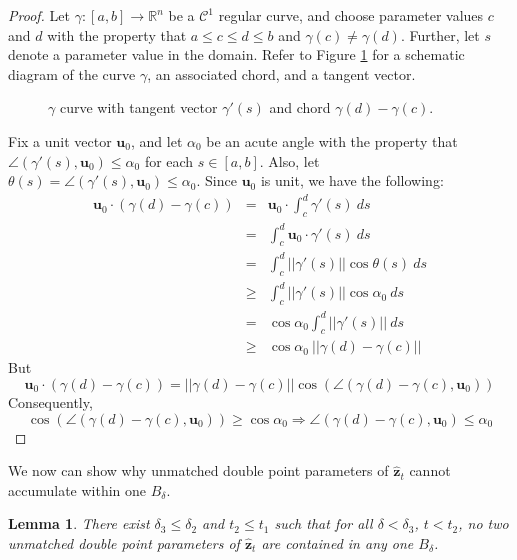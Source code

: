 \documentclass[12pt]{article}
\numberwithin{equation}{subsection}
\newtheorem{lem}{Lemma}[thm]
\theoremstyle{definition}
\numberwithin{lem}{section}
\def\zhat{\mathbf{\hat{z}}}
\def\C{\mathcal{C}}
\begin{document}
\begin{proof}
Let $\gamma: [a,b] \rightarrow \mathbb{R}^n$ be a $\C^1$ regular curve, and choose parameter values $c$ and $d$ with the property that $a \leq c \leq d \leq b$ and $\gamma(c) \neq \gamma(d)$.  Further, let $s$ denote a parameter value in the domain.  Refer to Figure \ref{fig:chordvector} for a schematic diagram of the curve $\gamma$, an associated chord, and a tangent vector.

\begin{figure}[h]
\begin{center}
\tikzset{font=\footnotesize}

\end{center}
\caption{$\gamma$ curve with tangent vector $\gamma'(s)$ and chord $\gamma(d) - \gamma(c)$.}
\label{fig:chordvector}
\end{figure}

\noindent Fix a unit vector $\mathbf{u}_0$, and let $\alpha_0$ be an acute angle with the property that $\angle(\gamma'(s), \mathbf{u}_0) \leq \alpha_0$ for each $s \in [a,b]$.  Also, let $\theta(s) = \angle(\gamma'(s), \mathbf{u}_0) \leq \alpha_0$.  Since $\mathbf{u}_0$ is unit, we have the following:
\begin{eqnarray*}
\mathbf{u}_0 \cdot (\gamma(d) - \gamma(c)) & = & \mathbf{u}_0 \cdot \int_c^d \gamma'(s)\ ds\\
& = &  \int_c^d  \mathbf{u}_0 \cdot \gamma'(s)\ ds\\
& = & \int_c^d ||\gamma'(s)||\cos\theta(s)\ ds\\
& \geq & \int_c^d ||\gamma'(s)||\cos\alpha_0\ ds\\
& = & \cos \alpha_0 \int_c^d ||\gamma'(s)||\ ds\\
& \geq & \cos\alpha_0\ ||\gamma(d) - \gamma(c)||
\end{eqnarray*}
\noindent But $$\mathbf{u}_0 \cdot (\gamma(d) - \gamma(c)) = ||\gamma(d) - \gamma(c)||\cos\left(\angle(\gamma(d) - \gamma(c), \mathbf{u}_0)\right)$$
Consequently, $$\cos(\angle(\gamma(d) - \gamma(c), \mathbf{u}_0)) \geq \cos\alpha_0 \Longrightarrow \angle(\gamma(d) - \gamma(c), \mathbf{u}_0) \leq \alpha_0$$
\end{proof}


We now can show why unmatched double point parameters of $\zhat_t$ cannot accumulate within one $B_\delta$.

\begin{lem}
There exist   $\delta_3 \leq \delta_2$ and $t_2 \leq t_1$ such that for all  $\delta<\delta_3$, $t<t_2$, no two unmatched double point parameters of $\zhat_t$  are  contained in any one $B_\delta$.
\label{UNmatchedParameters}
\end{lem}
\end{document}
